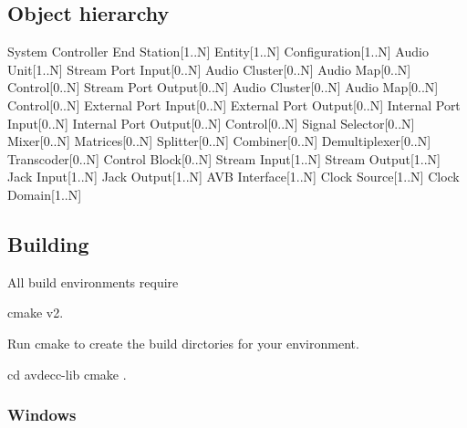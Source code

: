 \subsection*{Object hierarchy }

\begin{DoxyVerb}System
Controller
    End Station[1..N]
        Entity[1..N]
            Configuration[1..N]
                Audio Unit[1..N]
                        Stream Port Input[0..N]
                                    Audio Cluster[0..N]
                                    Audio Map[0..N]
                                    Control[0..N]
                        Stream Port Output[0..N]
                                    Audio Cluster[0..N]
                                    Audio Map[0..N]
                                    Control[0..N]
                        External Port Input[0..N]
                        External Port Output[0..N]
                        Internal Port Input[0..N]
                        Internal Port Output[0..N]
                        Control[0..N]
                        Signal Selector[0..N]
                        Mixer[0..N]
                        Matrices[0..N]
                        Splitter[0..N]
                        Combiner[0..N]
                        Demultiplexer[0..N]
                        Transcoder[0..N]
                        Control Block[0..N]
                Stream Input[1..N]
                Stream Output[1..N]
                Jack Input[1..N]
                Jack Output[1..N]
                AVB Interface[1..N]
                Clock Source[1..N]
                Clock Domain[1..N]
\end{DoxyVerb}


\subsection*{Building }

All build environments require


\begin{DoxyEnumerate}
\item cmake v2.
\end{DoxyEnumerate}

Run cmake to create the build dirctories for your environment. \begin{DoxyVerb}cd avdecc-lib
cmake .
\end{DoxyVerb}


\subsubsection*{Windows}

